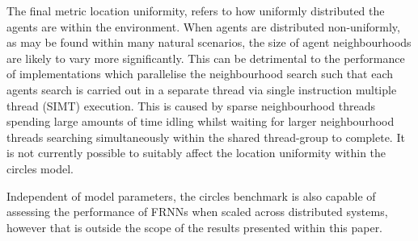     The final metric location uniformity, refers to how uniformly distributed the agents are within the environment. When agents are distributed non-uniformly, as may be found within many natural scenarios, the size of agent neighbourhoods are likely to vary more significantly. This can be detrimental to the performance of implementations which parallelise the neighbourhood search such that each agents search is carried out in a separate thread via single instruction multiple thread (SIMT) execution. This is caused by sparse neighbourhood threads spending large amounts of time idling whilst waiting for larger neighbourhood threads searching simultaneously within the shared thread-group to complete. It is not currently possible to suitably affect the location uniformity within the circles model.
    
    Independent of model parameters, the circles benchmark is also capable of assessing the performance of FRNNs when scaled across distributed systems, however that is outside the scope of the results presented within this paper.